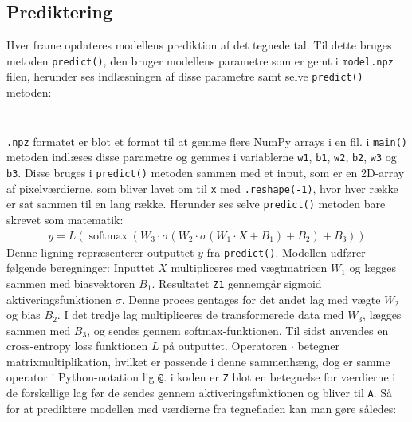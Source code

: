 \documentclass{article}
\begin{document}
\subsection{Prediktering}
Hver frame opdateres modellens prediktion af det tegnede tal. Til dette bruges metoden \texttt{predict()}, den bruger modellens parametre som er gemt i \texttt{model.npz} filen, herunder ses indlæsningen af disse parametre samt selve \texttt{predict()} metoden:
\inputminted[firstline=100, lastline=110]{python}{run.py}\noindent
\inputminted[firstline=89, lastline=97]{python}{run.py}\noindent
\texttt{.npz} formatet er blot et format til at gemme flere NumPy arrays i en fil. i \texttt{main()} metoden indlæses disse parametre og gemmes i variablerne \texttt{w1}, \texttt{b1}, \texttt{w2}, \texttt{b2}, \texttt{w3} og \texttt{b3}. Disse bruges i \texttt{predict()} metoden sammen med et input, som er en 2D-array af pixelværdierne, som bliver lavet om til \texttt{x} med \texttt{.reshape(-1)}, hvor hver række er sat sammen til en lang række. Herunder ses selve \texttt{predict()} metoden bare skrevet som matematik:
\begin{align}
  y = L\left( \operatorname{softmax}\left( W_3 \cdot \sigma\left( W_2 \cdot \sigma\left( W_1 \cdot X + B_1 \right) + B_2 \right) + B_3 \right) \right)
\end{align}
Denne ligning repræsenterer outputtet $y$ fra \texttt{predict()}. Modellen udfører følgende beregninger: Inputtet $X$ multipliceres med vægtmatricen $W_1$ og lægges sammen med biasvektoren $B_1$. Resultatet \texttt{Z1} gennemgår sigmoid aktiveringsfunktionen $\sigma$. Denne proces gentages for det andet lag med vægte $W_2$ og bias $B_2$. I det tredje lag multipliceres de transformerede data med $W_3$, lægges sammen med $B_3$, og sendes gennem softmax-funktionen. Til sidst anvendes en cross-entropy loss funktionen $L$ på outputtet. Operatoren $\cdot$ betegner matrixmultiplikation, hvilket er passende i denne sammenhæng, dog er samme operator i Python-notation lig \texttt{@}. i koden er \texttt{Z} blot en betegnelse for værdierne i de forskellige lag før de sendes gennem aktiveringsfunktionen og bliver til \texttt{A}. Så for at prediktere modellen med værdierne fra tegnefladen kan man gøre således:
\inputminted[firstline=133, lastline=134]{python}{run.py}\noindent
\end{document}
